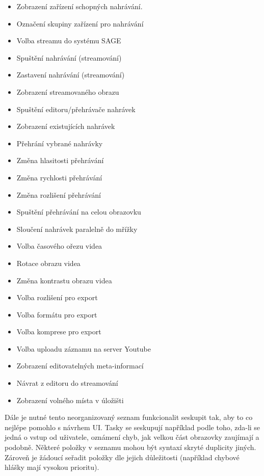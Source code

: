 \documentclass[thesis=M,czech]{FITthesis}[2012/06/26]
\begin{document}
\begin{itemize}
 \item Zobrazení zařízení schopných nahrávání.
 \item Označení skupiny zařízení pro nahrávání
 \item Volba streamu do systému SAGE
 \item Spuštění nahrávání (streamování)
 \item Zastavení nahrávání (streamování)
 \item Zobrazení streamovaného obrazu
 \item Spuštění editoru/přehrávače nahrávek
 \item Zobrazení existujících nahrávek
 \item Přehrání vybrané nahrávky
 \item Změna hlasitosti přehrávání
 \item Změna rychlosti přehrávání
 \item Změna rozlišení přehrávání
 \item Spuštění přehrávání na celou obrazovku
 \item Sloučení nahrávek paralelně do mřížky
 \item Volba časového ořezu videa 
 \item Rotace obrazu videa
 \item Změna kontrastu obrazu videa
 \item Volba rozlišení pro export
 \item Volba formátu pro export
 \item Volba komprese pro export
 \item Volba uploadu záznamu na server Youtube
 \item Zobrazení editovatelných meta-informací
 \item Návrat z editoru do streamování
 \item Zobrazení volného místa v úložišti
\end{itemize}

Dále je nutné tento neorganizovaný seznam funkcionalit seskupit tak, aby to co nejlépe pomohlo s návrhem UI. Tasky se seskupují například podle toho, zda-li se jedná o vstup od uživatele, oznámení chyb, jak velkou část obrazovky zaujímají a podobně. Některé položky v seznamu mohou být syntaxí skryté duplicity jiných. Zároveň je žádoucí seřadit položky dle jejich důležitosti (například chybové hlášky mají vysokou prioritu).
\end{document}
